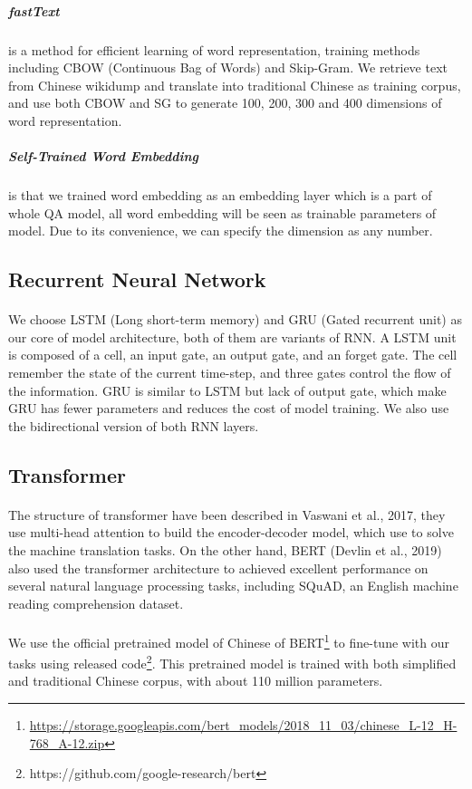 \documentclass{article}
\begin{document}
\subparagraph{fastText} is a method for efficient learning of word representation, training methods including CBOW (Continuous Bag of Words) and Skip-Gram. We retrieve text from Chinese wikidump and translate into traditional Chinese as training corpus, and use both CBOW and SG to generate 100, 200, 300 and 400 dimensions of word representation.

\subparagraph{Self-Trained Word Embedding} is that we trained word embedding as an embedding layer which is a part of whole QA model, all word embedding will be seen as trainable parameters of model. Due to its convenience, we can specify the dimension as any number.

\subsection{Recurrent Neural Network}
\paragraph{}
We choose LSTM\cite{hochreiter1997lstm} (Long short-term memory) and GRU\cite{cho2014learning} (Gated recurrent unit) as our core of model architecture, both of them are variants of RNN. A LSTM unit is composed of a cell, an input gate, an output gate, and an forget gate. The cell remember the state of the current time-step, and three gates control the flow of the information. GRU is similar to LSTM but lack of output gate, which make GRU has fewer parameters and reduces the cost of model training. We also use the bidirectional version of both RNN layers.

\subsection{Transformer}
\paragraph{}
The structure of transformer\cite{vaswani2017attention} have been described in Vaswani et al., 2017, they use multi-head attention to build the encoder-decoder model, which use to solve the machine translation tasks. On the other hand, BERT\cite{devlin2018bert} (Devlin et al., 2019) also used the transformer architecture to achieved excellent performance on several natural language processing tasks, including SQuAD, an English machine reading comprehension dataset.

\paragraph{}
We use the official pretrained model of Chinese of BERT\footnote{\url{https://storage.googleapis.com/bert_models/2018_11_03/chinese_L-12_H-768_A-12.zip}} to fine-tune with our tasks using released code\footnote{\label{run_squad}https://github.com/google-research/bert}. This pretrained model is trained with both simplified and traditional Chinese corpus, with about 110 million parameters.
\end{document}

